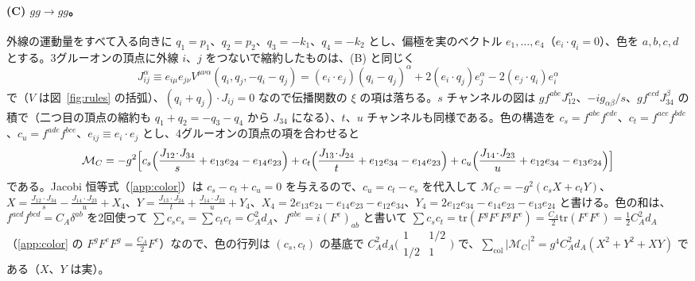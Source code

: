 \documentclass[a4paper,10pt]{ltjsarticle}
\newcommand{\tr}{\mathrm{tr}}
\begin{document}
\paragraph{(C) $gg\to gg$。}外線の運動量をすべて入る向きに $q_1=p_1$、$q_2=p_2$、$q_3=-k_1$、$q_4=-k_2$ とし、偏極を実のベクトル $e_1,\dots,e_4$（$e_i\cdot q_i=0$）、色を $a,b,c,d$ とする。3グルーオンの頂点に外線 $i$、$j$ をつないで縮約したものは、(B) と同じく
\begin{equation*}
J_{ij}^\alpha\equiv e_{i\mu}e_{j\nu}V^{\mu\nu\alpha}(q_i,q_j,-q_i-q_j)=(e_i\cdot e_j)(q_i-q_j)^\alpha+2(e_i\cdot q_j)e_j^\alpha-2(e_j\cdot q_i)e_i^\alpha
\end{equation*}
で（$V$ は図~\ref{fig:rules} の括弧）、$(q_i+q_j)\cdot J_{ij}=0$ なので伝播関数の $\xi$ の項は落ちる。$s$ チャンネルの図は $gf^{abe}J_{12}^\alpha$、$-ig_{\alpha\beta}/s$、$gf^{ecd}J_{34}^\beta$ の積で（二つ目の頂点の縮約も $q_1+q_2=-q_3-q_4$ から $J_{34}$ になる）、$t$、$u$ チャンネルも同様である。色の構造を $c_s=f^{abe}f^{cde}$、$c_t=f^{ace}f^{bde}$、$c_u=f^{ade}f^{bce}$、$e_{ij}\equiv e_i\cdot e_j$ とし、4グルーオンの頂点の項を合わせると
\begin{equation*}
\mathcal M_C=-g^2\Bigl[c_s\Bigl(\frac{J_{12}\!\cdot\!J_{34}}{s}+e_{13}e_{24}-e_{14}e_{23}\Bigr)+c_t\Bigl(\frac{J_{13}\!\cdot\!J_{24}}{t}+e_{12}e_{34}-e_{14}e_{23}\Bigr)+c_u\Bigl(\frac{J_{14}\!\cdot\!J_{23}}{u}+e_{12}e_{34}-e_{13}e_{24}\Bigr)\Bigr]
\end{equation*}
である。Jacobi 恒等式（\ref{app:color}）は $c_s-c_t+c_u=0$ を与えるので、$c_u=c_t-c_s$ を代入して $\mathcal M_C=-g^2(c_sX+c_tY)$、
$X=\frac{J_{12}\cdot J_{34}}{s}-\frac{J_{14}\cdot J_{23}}{u}+X_4$、$Y=\frac{J_{13}\cdot J_{24}}{t}+\frac{J_{14}\cdot J_{23}}{u}+Y_4$、$X_4=2e_{13}e_{24}-e_{14}e_{23}-e_{12}e_{34}$、$Y_4=2e_{12}e_{34}-e_{14}e_{23}-e_{13}e_{24}$ と書ける。色の和は、$f^{acd}f^{bcd}=C_A\delta^{ab}$ を2回使って $\sum c_sc_s=\sum c_tc_t=C_A^2d_A$、$f^{abe}=i(F^e)_{ab}$ と書いて $\sum c_sc_t=\tr(F^gF^eF^gF^e)=\frac{C_A}2\tr(F^eF^e)=\frac12C_A^2d_A$（\ref{app:color} の $F^gF^eF^g=\frac{C_A}2F^e$）なので、色の行列は $(c_s,c_t)$ の基底で $C_A^2d_A\bigl(\begin{smallmatrix}1&1/2\\1/2&1\end{smallmatrix}\bigr)$ で、$\sum_{\mathrm{col}}|\mathcal M_C|^2=g^4C_A^2d_A(X^2+Y^2+XY)$ である（$X$、$Y$ は実）。
\end{document}
